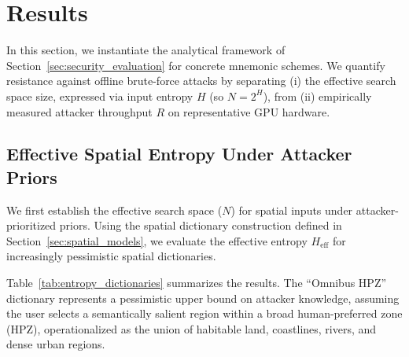\documentclass[mathematics,article,accept,pdftex,moreauthors]{Definitions/mdpi}
\begin{document}



\section{Results\label{sec5}}
\label{sec:results}


In this section, we instantiate the analytical framework of Section~\ref{sec:security_evaluation} for concrete mnemonic schemes. We quantify resistance against offline brute-force attacks by separating (i) the effective search space size, expressed via input entropy $H$ (so $N = 2^{H}$), from (ii) empirically measured attacker throughput $R$ on representative GPU hardware.


\subsection{Effective Spatial Entropy Under Attacker Priors}
\label{sec:entropy_floors}

We first establish the effective search space ($N$) for spatial inputs under attacker-prioritized priors. Using the spatial dictionary construction defined in Section~\ref{sec:spatial_models}, we evaluate the effective entropy $H_{\text{eff}}$ for increasingly pessimistic spatial dictionaries.

Table~\ref{tab:entropy_dictionaries} summarizes the results. The ``Omnibus HPZ'' dictionary represents a pessimistic upper bound on attacker knowledge, assuming the user selects a semantically salient region within a broad human-preferred zone (HPZ), operationalized as the union of habitable land, coastlines, rivers, and dense urban regions.
\end{document}
